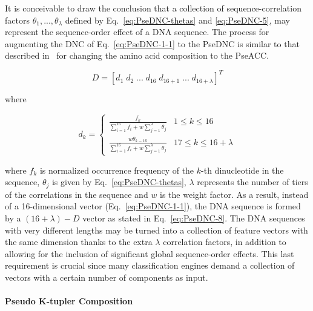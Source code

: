 It is conceivable to draw the conclusion that a collection of sequence-correlation factors $\theta_{1},...,\theta_{\lambda}$ defined by Eq.~\ref{eq:PseDNC-thetas} and \ref{eq:PseDNC-5}, may represent the sequence-order effect of a \gls{DNA} sequence. The process for augmenting the \gls{DNC} of Eq.~\ref{eq:PseDNC-1-1} to the \gls{PseDNC} is similar to that described in~\cite{Chou2001PredictionComposition} for changing the amino acid composition to the \gls{PseACC}.

\begin{equation}\label{eq:PseDNC-8}
    D = [d_{1}\;d_{2}\;...\;d_{16}\;d_{16+1}\;...\;d_{16+\lambda}]^{T}
\end{equation}

where

\begin{equation}\label{eq:PseDNC-9}
    d_{k} = \begin{cases}\frac{f_{k}}{\sum_{i=1}^{16} f_{i} + w\sum_{j=1}^{\lambda}\theta_{j}} & 1 \le k \le 16\\\frac{w\theta_{k-16}}{\sum_{i=1}^{16} f_{i} + w\sum_{j=1}^{\lambda}\theta_{j}} & 17 \le k \le 16 + \lambda\end{cases}
\end{equation}

where $f_{k}$ is normalized occurrence frequency of the $k$-th dinucleotide in the sequence, $\theta_{j}$ is given by Eq.~\ref{eq:PseDNC-thetas}, $\lambda$ represents the number of tiers of the correlations in the sequence and $w$ is the weight factor. As a result, instead of a 16-dimensional vector (Eq.~\ref{eq:PseDNC-1-1}), the \gls{DNA} sequence is formed by a $(16 + \lambda) - D$ vector as stated in Eq.~\ref{eq:PseDNC-8}. The \gls{DNA} sequences with very different lengths may be turned into a collection of feature vectors with the same dimension thanks to the extra $\lambda$ correlation factors, in addition to allowing for the inclusion of significant global sequence-order effects. This last requirement is crucial since many classification engines demand a collection of vectors with a certain number of components as input.


\paragraph{Pseudo K-tupler Composition}

